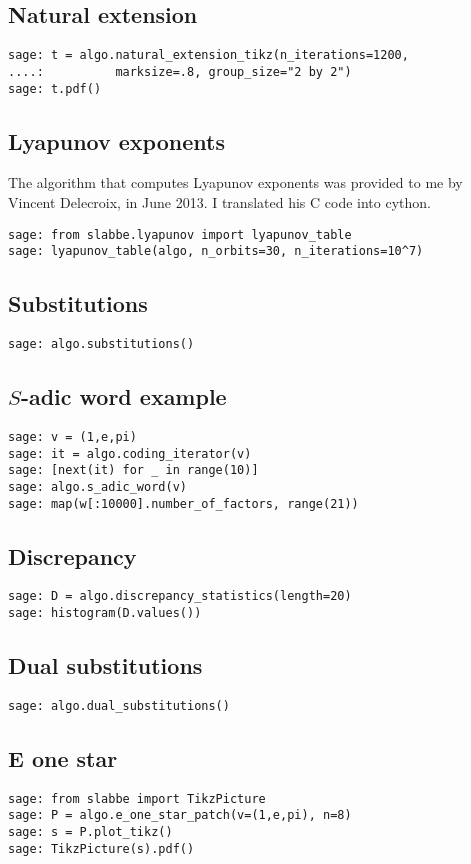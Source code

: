 \subsection{Natural extension}
\begin{verbatim}
sage: t = algo.natural_extension_tikz(n_iterations=1200, 
....:          marksize=.8, group_size="2 by 2")
sage: t.pdf()
\end{verbatim}
\subsection{Lyapunov exponents}
The algorithm that computes Lyapunov exponents was provided to me
by Vincent Delecroix, in June 2013. I translated his C code into cython.
\begin{verbatim}
sage: from slabbe.lyapunov import lyapunov_table
sage: lyapunov_table(algo, n_orbits=30, n_iterations=10^7)
\end{verbatim}
\subsection{Substitutions}
\begin{verbatim}
sage: algo.substitutions()
\end{verbatim}
\subsection{$S$-adic word example}
\begin{verbatim}
sage: v = (1,e,pi)
sage: it = algo.coding_iterator(v)
sage: [next(it) for _ in range(10)]
sage: algo.s_adic_word(v)
sage: map(w[:10000].number_of_factors, range(21))  
\end{verbatim}
\subsection{Discrepancy}
\begin{verbatim}
sage: D = algo.discrepancy_statistics(length=20)
sage: histogram(D.values())
\end{verbatim}
\subsection{Dual substitutions}
\begin{verbatim}
sage: algo.dual_substitutions()
\end{verbatim}
\subsection{E one star}
\begin{verbatim}
sage: from slabbe import TikzPicture
sage: P = algo.e_one_star_patch(v=(1,e,pi), n=8)
sage: s = P.plot_tikz()
sage: TikzPicture(s).pdf()
\end{verbatim}
